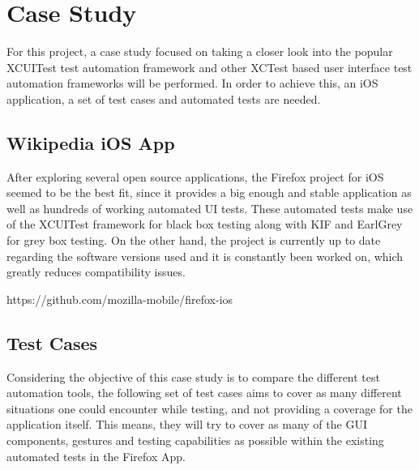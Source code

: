\chapter{Case Study}
\label{chapter3}
For this project, a case study focused on taking a closer look into the popular XCUITest test automation framework and other XCTest based user interface test automation frameworks will be performed. In order to achieve this, an iOS application, a set of test cases and automated tests are needed.


\section{Wikipedia iOS App}
After exploring several open source applications, the Firefox project for iOS seemed to be the best fit, since it provides a big enough and stable application as well as hundreds of working automated UI tests. These automated tests make use of the XCUITest framework for black box testing along with KIF and EarlGrey for grey box testing. On the other hand, the project is currently up to date regarding the software versions used and it is constantly been worked on, which greatly reduces compatibility issues.

https://github.com/mozilla-mobile/firefox-ios

\section{Test Cases}
Considering the objective of this case study is to compare the different test automation tools, the following set of test cases aims to cover as many different situations one could encounter while testing, and not providing a coverage for the application itself. This means, they will try to cover as many of the GUI components, gestures and testing capabilities as possible within the existing automated tests in the Firefox App.

